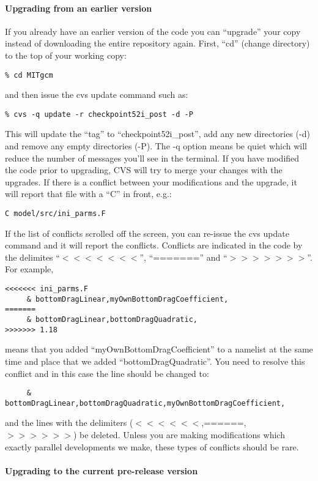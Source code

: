 \paragraph*{Upgrading from an earlier version}

If you already have an earlier version of the code you can ``upgrade''
your copy instead of downloading the entire repository again. First,
``cd'' (change directory) to the top of your working copy:
\begin{verbatim}
% cd MITgcm
\end{verbatim}
and then issue the cvs update command such as:
\begin{verbatim}
% cvs -q update -r checkpoint52i_post -d -P
\end{verbatim}
This will update the ``tag'' to ``checkpoint52i\_post'', add any new
directories (-d) and remove any empty directories (-P). The -q option
means be quiet which will reduce the number of messages you'll see in
the terminal. If you have modified the code prior to upgrading, CVS
will try to merge your changes with the upgrades. If there is a
conflict between your modifications and the upgrade, it will report
that file with a ``C'' in front, e.g.:
\begin{verbatim}
C model/src/ini_parms.F
\end{verbatim}
If the list of conflicts scrolled off the screen, you can re-issue the
cvs update command and it will report the conflicts. Conflicts are
indicated in the code by the delimites ``$<<<<<<<$'', ``======='' and
``$>>>>>>>$''. For example,
\begin{verbatim}
<<<<<<< ini_parms.F
     & bottomDragLinear,myOwnBottomDragCoefficient,
=======
     & bottomDragLinear,bottomDragQuadratic,
>>>>>>> 1.18
\end{verbatim}
means that you added ``myOwnBottomDragCoefficient'' to a namelist at
the same time and place that we added ``bottomDragQuadratic''. You
need to resolve this conflict and in this case the line should be
changed to:
\begin{verbatim}
     & bottomDragLinear,bottomDragQuadratic,myOwnBottomDragCoefficient,
\end{verbatim}
and the lines with the delimiters ($<<<<<<$,======,$>>>>>>$) be deleted.
Unless you are making modifications which exactly parallel
developments we make, these types of conflicts should be rare.

\paragraph*{Upgrading to the current pre-release version}

